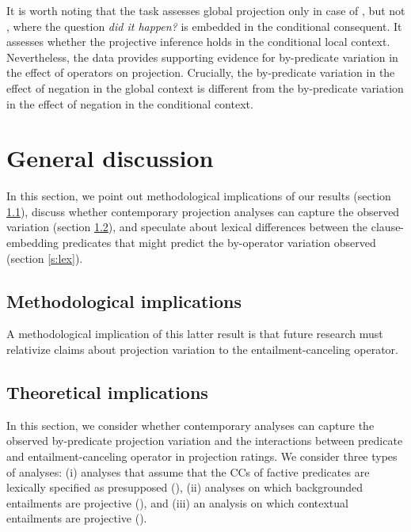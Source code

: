 \documentclass[a4paper,12pt,twoside]{article}
\begin{document}
			It is worth noting that the task assesses global projection only in case of \Last[a], but not \Last[b+c], where the question \textit{did it happen?} is embedded in the conditional consequent. It assesses whether the projective inference holds in the conditional local context. Nevertheless, the data provides supporting evidence for by-predicate variation in the effect of operators on projection. Crucially, the by-predicate variation in the effect of negation in the global context is different from the by-predicate variation in the effect of negation in the conditional context.


\section{General discussion}\label{s:general}

In this section, we point out methodological implications of our results (section \ref{s:method-impl}), discuss whether contemporary projection analyses can capture the observed variation (section \ref{s:analysis}), and speculate about lexical differences between the clause-embedding predicates that might predict the by-operator variation observed (section \ref{s:lex}).

\subsection{Methodological implications}\label{s:method-impl}

A methodological implication of this latter result is that future research must relativize claims about projection variation to the entailment-canceling operator.

\subsection{Theoretical implications}\label{s:analysis}

In this section, we consider whether contemporary analyses can capture the observed by-predicate projection variation and the interactions between predicate and entailment-canceling operator in projection ratings. We consider three types of analyses: (i) analyses that assume that the CCs of factive predicates are lexically specified as presupposed  (\citealt{heim_projection_1983,heim_presupposition_1992,van_der_sandt_presupposition_1992}), (ii) analyses on which backgrounded entailments are projective (\citealt{abrusan_predicting_2011,simons_best_2017}), and (iii) an analysis on which contextual entailments are projective 
(\citealt{schlenker_triggering_2021}). 
\end{document}
